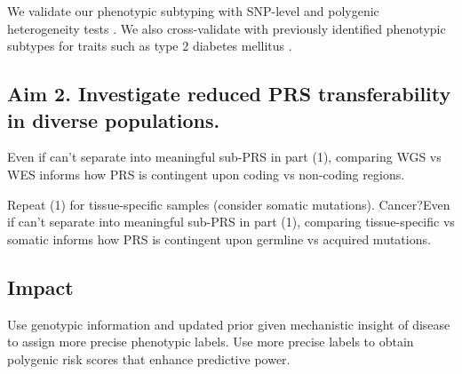 \documentclass[11pt]{article}  %
\begin{document}
We validate our phenotypic subtyping with SNP-level and polygenic heterogeneity tests \cite{dahl_robust_2020}\cite{dahl_reverse_2019}. We also cross-validate with previously identified phenotypic subtypes for traits such as type 2 diabetes mellitus \cite{li_identification_2015}. 


\subsection*{Aim 2. Investigate reduced PRS transferability in diverse populations.}
Even if can’t separate into meaningful sub-PRS in part (1), comparing WGS vs WES informs how PRS is contingent upon coding vs non-coding regions.

Repeat (1) for tissue-specific samples (consider somatic mutations). Cancer?Even if can’t separate into meaningful sub-PRS in part (1), comparing tissue-specific vs somatic informs how PRS is contingent upon germline vs acquired mutations.

\subsection*{Impact}
Use genotypic information and updated prior given mechanistic insight of disease to assign more precise phenotypic labels. Use more precise labels to obtain polygenic risk scores that enhance predictive power.












\newpage

\end{document}
